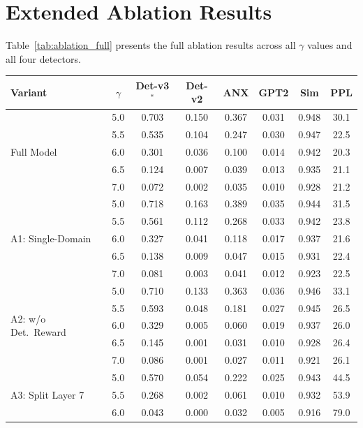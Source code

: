 \section{Extended Ablation Results}
\label{sec:app_ablation}

Table~\ref{tab:ablation_full} presents the full ablation results across all $\gamma$ values and all four detectors.

\begin{table}[t]
\centering
\small
\begin{tabular}{l c cccc cc}
\toprule
\textbf{Variant} & $\gamma$ & \textbf{Det-v3}$^*$ & \textbf{Det-v2} & \textbf{ANX} & \textbf{GPT2} & \textbf{Sim} & \textbf{PPL} \\
\midrule
\multirow{5}{*}{Full Model}
& 5.0 & 0.703 & 0.150 & 0.367 & 0.031 & 0.948 & 30.1 \\
& 5.5 & 0.535 & 0.104 & 0.247 & 0.030 & 0.947 & 22.5 \\
& 6.0 & 0.301 & 0.036 & 0.100 & 0.014 & 0.942 & 20.3 \\
& 6.5 & 0.124 & 0.007 & 0.039 & 0.013 & 0.935 & 21.1 \\
& 7.0 & 0.072 & 0.002 & 0.035 & 0.010 & 0.928 & 21.2 \\
\midrule
\multirow{5}{*}{A1: Single-Domain}
& 5.0 & 0.718 & 0.163 & 0.389 & 0.035 & 0.944 & 31.5 \\
& 5.5 & 0.561 & 0.112 & 0.268 & 0.033 & 0.942 & 23.8 \\
& 6.0 & 0.327 & 0.041 & 0.118 & 0.017 & 0.937 & 21.6 \\
& 6.5 & 0.138 & 0.009 & 0.047 & 0.015 & 0.931 & 22.4 \\
& 7.0 & 0.081 & 0.003 & 0.041 & 0.012 & 0.923 & 22.5 \\
\midrule
\multirow{5}{*}{A2: w/o Det.~Reward}
& 5.0 & 0.710 & 0.133 & 0.363 & 0.036 & 0.946 & 33.1 \\
& 5.5 & 0.593 & 0.048 & 0.181 & 0.027 & 0.945 & 26.5 \\
& 6.0 & 0.329 & 0.005 & 0.060 & 0.019 & 0.937 & 26.0 \\
& 6.5 & 0.145 & 0.001 & 0.031 & 0.010 & 0.928 & 26.4 \\
& 7.0 & 0.086 & 0.001 & 0.027 & 0.011 & 0.921 & 26.1 \\
\midrule
\multirow{5}{*}{A3: Split Layer 7}
& 5.0 & 0.570 & 0.054 & 0.222 & 0.025 & 0.943 & 44.5 \\
& 5.5 & 0.268 & 0.002 & 0.061 & 0.010 & 0.932 & 53.9 \\
& 6.0 & 0.043 & 0.000 & 0.032 & 0.005 & 0.916 & 79.0 \\

\end{tabular}
\end{table}
